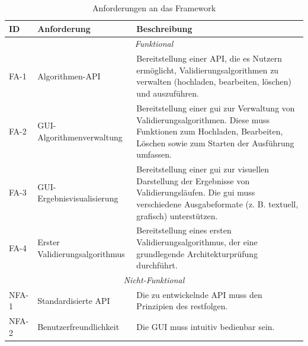 \begin{table}[h!]
  \centering
  \footnotesize
  \begin{tabularx}{\textwidth}{l l X}
    \toprule
    \textbf{ID} & \textbf{Anforderung}           & \textbf{Beschreibung}                                                                                                                                                                   \\
    \midrule
    \multicolumn{3}{c}{\textit{Funktional}}                                                                                                                                                                                                \\
    \midrule
    FA-1        & Algorithmen-API                & Bereitstellung einer API, die es Nutzern ermöglicht, Validierungsalgorithmen zu verwalten (hochladen, bearbeiten, löschen) und auszuführen.                                             \\
    \midrule
    FA-2        & GUI-Algorithmenverwaltung      & Bereitstellung einer \gls{gui} zur Verwaltung von Validierungsalgorithmen. Diese muss Funktionen zum Hochladen, Bearbeiten, Löschen sowie zum Starten der Ausführung umfassen.          \\
    \midrule
    FA-3        & GUI-Ergebnisvisualisierung                  & Bereitstellung einer \gls{gui} zur visuellen Darstellung der Ergebnisse von Validierungsläufen. Die \gls{gui} muss verschiedene Ausgabeformate (z. B. textuell, grafisch) unterstützen. \\
    \midrule
    FA-4        & Erster Validierungsalgorithmus & Bereitstellung eines ersten Validierungsalgorithmus, der eine grundlegende Architekturprüfung durchführt.                                                                               \\
    \bottomrule
    \multicolumn{3}{c}{\textit{Nicht-Funktional}}                                                                                                                                                                                          \\
    \midrule
    NFA-1       & Standardisierte API            & Die zu entwickelnde API muss den Prinzipien des \gls{rest}folgen.                                                                                                                       \\
    \midrule
    NFA-2       & Benutzerfreundlichkeit         & Die GUI muss intuitiv bedienbar sein.                                                                                                                                                   \\
    \bottomrule
  \end{tabularx}
  \caption{Anforderungen an das Framework}
  \label{tab:anforderungen}
\end{table}

